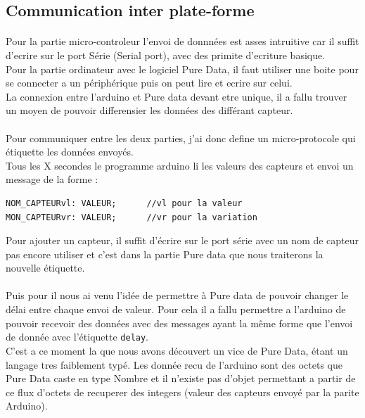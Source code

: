 \documentclass[a4paper, titlepage, oneside, 12pt]{article}%
\begin{document}
\subsection{Communication inter plate-forme}
\paragraph{}
Pour la partie micro-controleur l'envoi de donnnées est asses intruitive car il suffit d'ecrire sur le port Série (Serial port), avec des primite d'ecriture basique.\\
Pour la partie ordinateur avec le logiciel Pure Data, il faut utiliser une boite pour se connecter a un périphérique puis on peut lire et ecrire sur celui.\\
La connexion entre l'arduino et Pure data devant etre unique, il a fallu trouver un moyen de pouvoir differensier les données des différant capteur. 

\paragraph{}
Pour communiquer entre les deux parties, j'ai donc define un micro-protocole qui étiquette les données envoyés.\\
Tous les X secondes le programme arduino li les valeurs des capteurs et envoi un message de la forme :
\begin{lstlisting}
NOM_CAPTEURvl: VALEUR;		//vl pour la valeur
MON_CAPTEURvr: VALEUR;		//vr pour la variation
\end{lstlisting}

Pour ajouter un capteur, il suffit d'écrire sur le port série avec un nom de capteur pas encore utiliser et c'est dans la partie Pure data que nous traiterons la nouvelle étiquette.

\paragraph{}
Puis pour il nous ai venu l'idée de permettre à Pure data de pouvoir changer le délai entre chaque envoi de valeur. 
Pour cela il a fallu permettre a l'arduino de pouvoir recevoir des données avec des messages ayant la même forme que l'envoi de donnée avec l'étiquette \texttt{delay}.\\
C'est a ce moment la que nous avons découvert un vice de Pure Data, étant un langage tres faiblement typé. Les donnée recu de l'arduino sont des octets que Pure Data caste en type Nombre et il n'existe pas d'objet permettant a partir de ce flux d'octets de recuperer des integers (valeur des capteurs envoyé par la parite Arduino).\\
\end{document}
